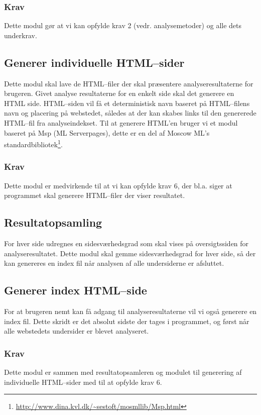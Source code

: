 \documentclass[a4paper,oneside]{memoir}
\begin{document}
\subsubsection{Krav}
Dette modul gør at vi kan opfylde krav 2 (vedr. analysemetoder) og
alle dets underkrav.

\subsection{Generer individuelle HTML--sider}
Dette modul skal lave de HTML--filer der skal præsentere
analyseresultaterne for brugeren. Givet analyse resultaterne for en
enkelt side skal det generere en HTML side. HTML--siden vil få et
deterministisk navn baseret på HTML--filens navn og placering på
webstedet, således at der kan skabes links til den genererede HTML--fil
fra analyseindekset. Til at generere HTML'en bruger vi et modul
baseret på Msp (ML Serverpages), dette er en del af Moscow ML's
standardbibliotek\footnote{\url{http://www.dina.kvl.dk/~sestoft/mosmllib/Msp.html}}.

\subsubsection{Krav}
Dette modul er medvirkende til at vi kan opfylde krav 6, der
bl.a. siger at programmet skal generere HTML--filer der viser
resultatet.

\subsection{Resultatopsamling}
For hver side udregnes en sidesværhedsgrad som skal vises på
oversigtssiden for analyseresultatet. Dette modul skal gemme
sidesværhedsgrad for hver side, så der kan genereres en index fil når
analysen af alle undersiderne er afsluttet.

\subsection{Generer index HTML--side}
For at brugeren nemt kan få adgang til analyseresultaterne vil vi også
generere en index fil. Dette skridt er det absolut sidste der tages i
programmet, og først når alle webstedets undersider er blevet
analyseret.

\subsubsection{Krav}
Dette modul er sammen med resultatopsamleren og modulet til generering
af individuelle HTML--sider med til at opfylde krav 6.
\end{document}
